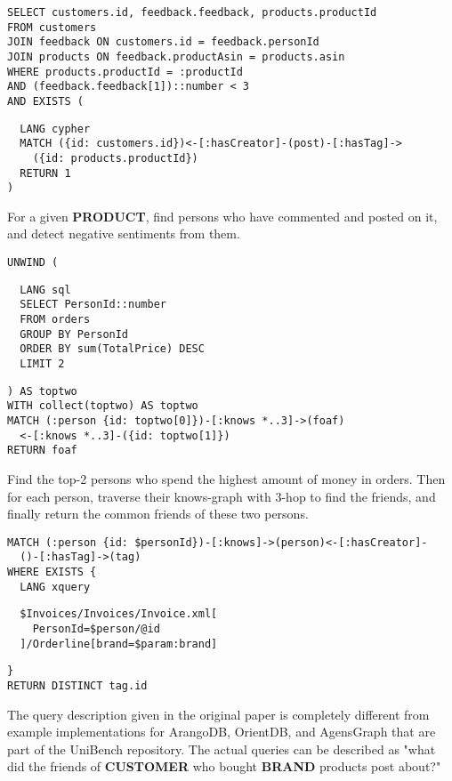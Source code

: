 \begin{listing}[!ht]
\begin{verbatim}
SELECT customers.id, feedback.feedback, products.productId
FROM customers
JOIN feedback ON customers.id = feedback.personId
JOIN products ON feedback.productAsin = products.asin
WHERE products.productId = :productId
AND (feedback.feedback[1])::number < 3
AND EXISTS (
\end{verbatim}
\nestedMintedVspace
\begin{verbatim}
  LANG cypher
  MATCH ({id: customers.id})<-[:hasCreator]-(post)-[:hasTag]->
    ({id: products.productId})
  RETURN 1
)
\end{verbatim}
\caption{For a given \textbf{PRODUCT}, find persons who have commented and posted on it, and detect negative sentiments from them.}
\end{listing}

\begin{listing}[!ht]
\begin{verbatim}
UNWIND (
\end{verbatim}
\nestedMintedVspace
\begin{verbatim}
  LANG sql
  SELECT PersonId::number
  FROM orders
  GROUP BY PersonId
  ORDER BY sum(TotalPrice) DESC
  LIMIT 2
\end{verbatim}
\nestedMintedVspace
\begin{verbatim}
) AS toptwo
WITH collect(toptwo) AS toptwo
MATCH (:person {id: toptwo[0]})-[:knows *..3]->(foaf)
  <-[:knows *..3]-({id: toptwo[1]})
RETURN foaf
\end{verbatim}
\caption{Find the top-2 persons who spend the highest amount of money in orders. Then for each person, traverse their knows-graph with 3-hop to find the friends, and finally return the common friends of these two persons.}
\end{listing}

\begin{listing}[!ht]
\begin{verbatim}
MATCH (:person {id: $personId})-[:knows]->(person)<-[:hasCreator]-
  ()-[:hasTag]->(tag)
WHERE EXISTS {
  LANG xquery
\end{verbatim}
\nestedMintedVspace
\begin{verbatim}
  $Invoices/Invoices/Invoice.xml[
    PersonId=$person/@id
  ]/Orderline[brand=$param:brand]
\end{verbatim}
\nestedMintedVspace
\begin{verbatim}
}
RETURN DISTINCT tag.id
\end{verbatim}
\caption{The query description given in the original paper is completely different from example implementations for ArangoDB, OrientDB, and AgensGraph that are part of the UniBench repository. The actual queries can be described as "what did the friends of \textbf{CUSTOMER} who bought \textbf{BRAND} products post about?"}
\end{listing}

